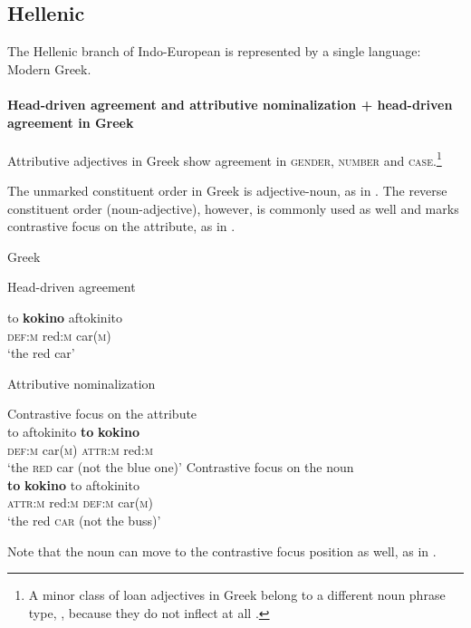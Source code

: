 \subsection{Hellenic}
\label{greek synchr}
The Hellenic branch of Indo-European is represented by a single language: Modern Greek. 

\paragraph*{Head\hyp{}driven agreement and attributive nominalization + head\hyp{}driven agreement in Greek}
Attributive adjectives in Greek show agreement in \textsc{gender, number} and \textsc{case}.\footnote{A minor class of loan adjectives in Greek belong to a different noun phrase type, , because they do not inflect at all \citep{ruge1986}.}

The unmarked constituent order in Greek is adjective-noun, as in . The reverse constituent order (noun-adjective), however, is commonly used as well and marks contrastive focus on the attribute, as in .
\begin{exe}
\ex \rm{Greek \citep{ruge1986}}
\begin{xlist}
\ex \rm{Head\hyp{}driven agreement}
\label{greek agr}
\begin{xlist}
\ex
\gll	to			\textbf{kokino} 	aftokinito\\
	\textsc{def:m}	red:\textsc{m}	car(\textsc{m})\\
\glt	‘the red car’
\end{xlist}
\ex \rm{Attributive nominalization}
\label{greek attr}
\begin{xlist}
\ex \rm{Contrastive focus on the attribute}\\
\label{greek afocus}
\gll	to 			aftokinito		\textbf{to}				\textbf{kokino}\\
	\textsc{def:m}	car(\textsc{m})	\textsc{attr:m}	red:\textsc{m}\\
\glt	‘the \textsc{red} car (not the blue one)’
\ex \rm{Contrastive focus on the noun}\\
\label{greek nfocus}
\gll	\textbf{to}				\textbf{kokino}		to		aftokinito\\
	\textsc{attr:m}	red:\textsc{m}	\textsc{def:m}	car(\textsc{m})\\
\glt	‘the red \textsc{car} (not the buss)’
\end{xlist}
\end{xlist}
\end{exe}
Note that the noun can move to the contrastive focus position as well, as in .

